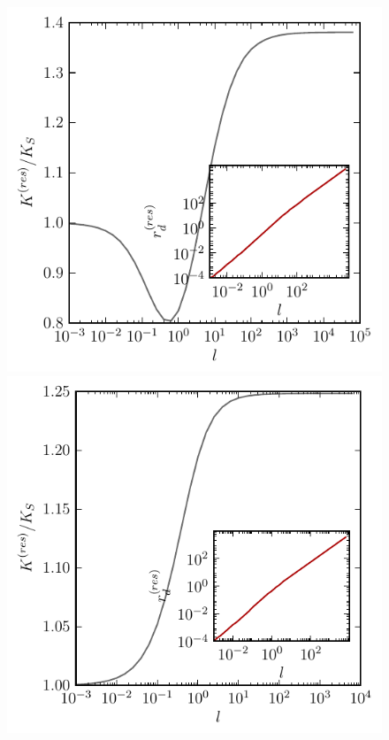     \begin{figure}[t!]
\begin{minipage}[t]{.5 \textwidth}
        \includegraphics[width = 1 \textwidth]{plots/rep_l.pdf}
\end{minipage}\begin{minipage}[t]{.5 \textwidth}
        \includegraphics[width = 1 \textwidth]{plots/att_l.pdf}

\end{minipage}
\end{figure}
